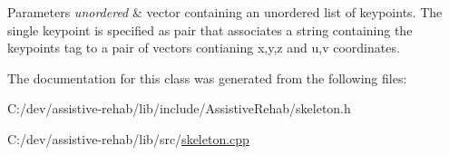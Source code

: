 \begin{DoxyParams}{Parameters}
{\em unordered} & vector containing an unordered list of keypoints. The single keypoint is specified as pair that associates a string containing the keypoint\textquotesingle{}s tag to a pair of vectors contianing x,y,z and u,v coordinates. \\
\hline
\end{DoxyParams}


The documentation for this class was generated from the following files\+:\begin{DoxyCompactItemize}
\item 
C\+:/dev/assistive-\/rehab/lib/include/\+Assistive\+Rehab/skeleton.\+h\item 
C\+:/dev/assistive-\/rehab/lib/src/\mbox{\hyperlink{skeleton_8cpp}{skeleton.\+cpp}}\end{DoxyCompactItemize}
